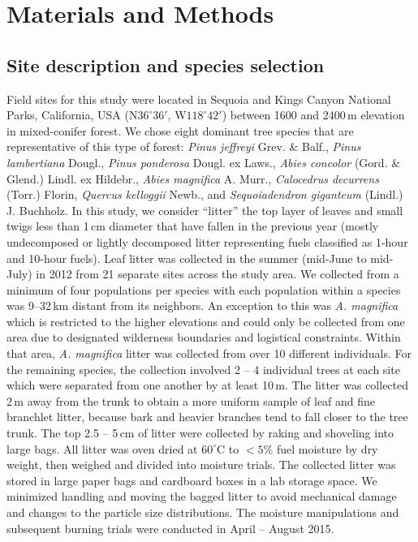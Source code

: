 \documentclass[letterpaper,12pt]{article}
\begin{document}
\section*{Materials and Methods}

\subsection*{Site description and species selection}

Field sites for this study were located in Sequoia and Kings Canyon National
Parks, California, USA (N$36^\circ 36'$, W$118^\circ 42'$) between 1600 and
2400\,m elevation in mixed-conifer forest. We chose eight dominant tree species
that are representative of this type of forest: \emph{Pinus jeffreyi} Grev. \&
Balf., \emph{Pinus lambertiana} Dougl., \emph{Pinus ponderosa} Dougl. ex Laws.,
\emph{Abies concolor} (Gord. \& Glend.) Lindl. ex Hildebr., \emph{Abies
  magnifica} A. Murr., \emph{Calocedrus decurrens} (Torr.) Florin,
\emph{Quercus kelloggii} Newb., and \emph{Sequoiadendron giganteum} (Lindl.) J.
Buchholz. In this study, we consider ``litter'' the top layer of leaves and small
twigs less than 1\,cm diameter that have fallen in the previous year (mostly
undecomposed or lightly decomposed litter representing fuels classified as
1-hour and 10-hour fuels). Leaf litter was collected in the summer (mid-June to
mid-July) in 2012 from 21 separate sites across the study area. We collected
from a minimum of four populations per species with each population within a
species was 9--32\,km distant from its neighbors. An exception to this was
\emph{A. magnifica} which is restricted to the higher elevations and could only
be collected from one area due to designated wilderness boundaries and
logistical constraints. Within that area, \emph{A. magnifica} litter was
collected from over 10 different individuals. For the remaining species, the
collection involved 2 -- 4 individual trees at each site which were separated
from one another by at least 10\,m. The litter was collected 2\,m away from the
trunk to obtain a more uniform sample of leaf and fine branchlet litter,
because bark and heavier branches tend to fall closer to the tree trunk. The
top 2.5 -- 5\,cm of litter were collected by raking and shoveling into large bags.
All litter was oven dried at $60^\circ$C to $< 5$\% fuel moisture by dry
weight, then weighed and divided into moisture trials. The collected litter was
stored in large paper bags and cardboard boxes in a lab storage space. We
minimized handling and moving the bagged litter to avoid mechanical damage and
changes to the particle size distributions. The moisture manipulations and
subsequent burning trials were conducted in April -- August 2015.
\end{document}
